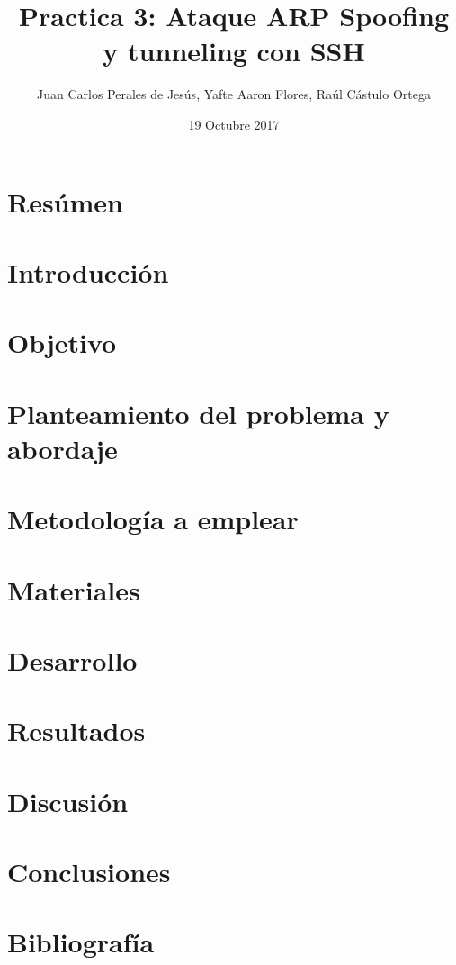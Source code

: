 \documentclass{article}
\title{Practica 3: Ataque ARP Spoofing y tunneling con SSH}
\author{Juan Carlos Perales de Jes\'us, Yafte Aaron Flores, Ra\'ul C\'astulo Ortega}
\date{19 Octubre 2017}
\begin{document}
\maketitle

\section{Res\'umen}

\section{Introducci\'on}

\section{Objetivo}

\section{Planteamiento del problema y abordaje}

\section{Metodolog\'ia a emplear}

\section{Materiales}

\section{Desarrollo}

\section{Resultados}

\section{Discusi\'on}

\section{Conclusiones}

\section{Bibliograf\'ia}
\end{document}

